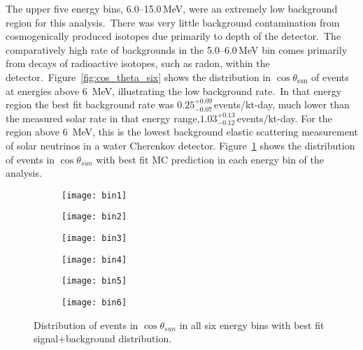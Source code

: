The upper five energy bins, \numrange[range-phrase=--]{6.0}{15.0}\,MeV, were an
extremely low background region for this analysis.\
There was very little background contamination from
cosmogenically produced isotopes due primarily to depth of the detector.\
The comparatively high rate of backgrounds in the \numrange[range-phrase=--]{5.0}{6.0}\,MeV bin
comes primarily from decays of radioactive isotopes, such as radon, within the detector.\
Figure~\ref{fig:cos_theta_six} shows the distribution in $\cos\theta_\text{{sun}}$ of events at
energies above 6~MeV, illustrating the low background rate.\
In that energy region the best fit background rate was $0.25^{+0.09}_{-0.07}$\,events/kt-day, much
lower than the measured solar rate in that energy range,$1.03^{+0.13}_{-0.12}$\,events/kt-day.
For the region above 6~MeV, this is the lowest
background elastic scattering measurement of solar neutrinos in a water
Cherenkov detector.
Figure~\ref{fig:binbybin} shows the distribution of events in $\cos\theta_{sun}$
with best fit MC prediction in each energy bin of the analysis.

\begin{figure}
\centering
\begin{subfigure}[b]{0.48\textwidth}
\centering
\texttt{[image: bin1]}
\caption{}
\end{subfigure}
\hfill
\begin{subfigure}[b]{0.48\textwidth}
\centering
\texttt{[image: bin2]}
\caption{}
\end{subfigure}

\begin{subfigure}[b]{0.48\textwidth}
\centering
\texttt{[image: bin3]}
\caption{}
\end{subfigure}
\hfill
\begin{subfigure}[b]{0.48\textwidth}
\centering
\texttt{[image: bin4]}
\caption{}
\end{subfigure}

\begin{subfigure}[b]{0.48\textwidth}
\centering
\texttt{[image: bin5]}
\caption{}
\end{subfigure}
\hfill
\begin{subfigure}[b]{0.48\textwidth}
\centering
\texttt{[image: bin6]}
\caption{}
\end{subfigure}
\caption[Bin-by-Bin $\cos\theta_{sun}$ Distributions]{
Distribution of events in $\cos\theta_{sun}$ in all six energy bins with
best fit signal+background distribution.}
\label{fig:binbybin}
\end{figure}

